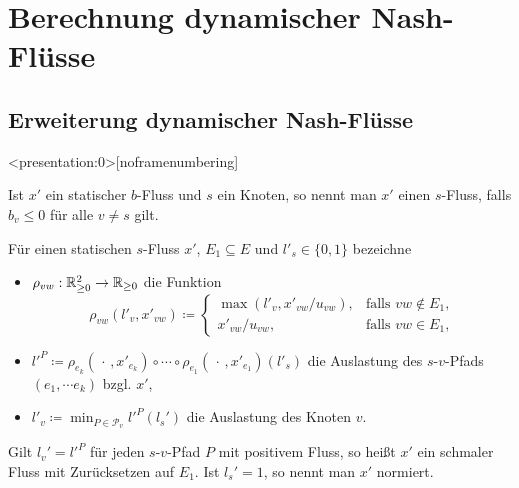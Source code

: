 \section{Berechnung dynamischer Nash-Flüsse}

\subsection{Erweiterung dynamischer Nash-Flüsse}

\begin{frame}<presentation:0>[noframenumbering]
\begin{definition}[$s$-Fluss]
	Ist $x'$ ein statischer $b$-Fluss und $s$ ein Knoten, so nennt man $x'$ einen $s$-Fluss, falls $b_v\leq 0$ für alle $v\neq s$ gilt.
\end{definition}

\pause\begin{definition}\label{def-thin-flow}
		Für einen statischen $s$-Fluss $x'$, $E_1\subseteq E$ und $l'_s\in\{ 0, 1 \}$ bezeichne
		\begin{itemize}[label=\color{darkblue}$\bullet$]
			\pause\item $\rho_{vw}: \mathbb{R}_{\geq 0}^2 \to \mathbb{R}_{\geq 0}$ die Funktion \[ \rho_{vw}(l'_v, x'_{vw}) \coloneq \begin{cases}
			\max(l'_v, x'_{vw} / u_{vw}), & \text{falls $vw\notin E_1$,}\\
			x'_{vw} / u_{vw}, & \text{falls $vw\in E_1$,}
			\end{cases}
			\]
			\item\pause $l'^P\coloneq \rho_{e_k}(\,\cdot\,, x'_{e_k}) \circ \cdots \circ \rho_{e_1}(\,\cdot\,, x'_{e_1}) (l'_s)$ die Auslastung des $s$-$v$-Pfads $(e_1, \cdots e_k)$ bzgl. $x'$,
			\item\pause $l'_v \coloneq \min_{P\in\mathcal{P}_v} l'^P(l_s')$ die Auslastung des Knoten $v$.
		\end{itemize}
		\pause Gilt $l_v' = l'^P$ für jeden $s$-$v$-Pfad $P$ mit positivem Fluss, so heißt $x'$ ein schmaler Fluss mit Zurücksetzen auf $E_1$.
		Ist $l_s' = 1$, so nennt man $x'$ normiert.
	\end{definition}
\end{frame}

